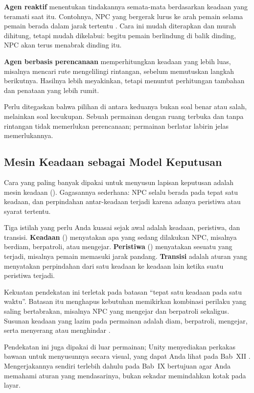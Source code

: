 \textbf{Agen reaktif} menentukan tindakannya semata-mata berdasarkan keadaan
yang teramati saat itu. Contohnya, NPC yang bergerak lurus ke arah pemain
selama pemain berada dalam jarak tertentu \cite{reintech-game-ai}. Cara ini
mudah diterapkan dan murah dihitung, tetapi mudah dikelabui: begitu pemain
berlindung di balik dinding, NPC akan terus menabrak dinding itu.

\textbf{Agen berbasis perencanaan} memperhitungkan keadaan yang lebih luas,
misalnya mencari rute mengelilingi rintangan, sebelum memutuskan langkah
berikutnya. Hasilnya lebih meyakinkan, tetapi menuntut perhitungan tambahan
dan penataan yang lebih rumit.

Perlu ditegaskan bahwa pilihan di antara keduanya bukan soal benar atau salah,
melainkan soal kecukupan. Sebuah permainan dengan ruang terbuka dan tanpa
rintangan tidak memerlukan perencanaan; permainan berlatar labirin jelas
memerlukannya.

\subsection{Mesin Keadaan sebagai Model Keputusan}

Cara yang paling banyak dipakai untuk menyusun lapisan keputusan adalah mesin
keadaan (). Gagasannya sederhana: NPC selalu
berada pada tepat satu keadaan, dan perpindahan antar-keadaan terjadi karena
adanya peristiwa atau syarat tertentu.

Tiga istilah yang perlu Anda kuasai sejak awal adalah keadaan, peristiwa, dan
transisi. \textbf{Keadaan} () menyatakan apa yang sedang
dilakukan NPC, misalnya berdiam, berpatroli, atau mengejar.
\textbf{Peristiwa} () menyatakan sesuatu yang terjadi, misalnya
pemain memasuki jarak pandang. \textbf{Transisi} adalah aturan yang menyatakan
perpindahan dari satu keadaan ke keadaan lain ketika suatu peristiwa terjadi.

Kekuatan pendekatan ini terletak pada batasan ``tepat satu keadaan pada satu
waktu''. Batasan itu menghapus kebutuhan memikirkan kombinasi perilaku yang
saling bertabrakan, misalnya NPC yang mengejar dan berpatroli sekaligus.
Susunan keadaan yang lazim pada permainan adalah diam, berpatroli, mengejar,
serta menyerang atau menghindar \cite{santos-fsm}.

Pendekatan ini juga dipakai di luar permainan; Unity menyediakan
perkakas bawaan untuk menyusunnya secara visual, yang dapat Anda lihat pada
Bab~XII \cite{unity-leveldesign}. Mengerjakannya sendiri terlebih dahulu pada
Bab~IX bertujuan agar Anda memahami aturan yang mendasarinya, bukan sekadar
memindahkan kotak pada layar.

